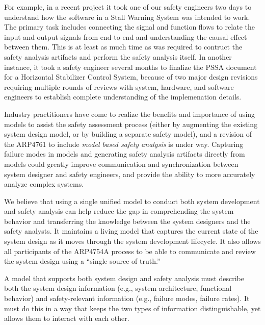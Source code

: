For example, in a recent project it took one of our safety engineers two days to understand how the software in a Stall Warning System was intended to work. The primary task includes connecting the signal and function flows to relate the input and output signals from end-to-end and understanding the causal effect between them. This is at least as much time as was required to contruct the safety analysis artifacts and perform the safety analysis itself. In another instance, it took a safety engineer several months to finalize the PSSA document for a Horizontal Stabilizer Control System, because of two major design revisions requiring multiple rounds of reviews with system, hardware, and software engineers to establish complete understanding of the implemenation details.

Industry practitioners have come to realize the benefits and importance of
using models to assist the safety assessment process (either by augmenting the existing system design model, or by building a separate safety model), and a revision of the ARP4761 to include {\em model based safety analysis} is under way.
Capturing failure modes in models and generating safety analysis artifacts directly from models could greatly improve communication and synchronization between system designer and safety engineers, and provide the ability to more accurately analyze complex systems. 

We believe that using a single unified model to conduct both system development and safety analysis can help reduce the gap in comprehending the system behavior and transferring the knowledge between the system designers and the safety analysts. It maintains a living model that captures the current state of the system design as it moves through the system development lifecycle.
It also allows all participants of the ARP4754A process to be able to communicate and review the system design using a ``single source of truth.''

A model that supports both system design and safety analysis must describe both the system design information (e.g., system architecture, functional behavior) and safety-relevant information (e.g., failure modes, failure rates).  It must do this in a way that keeps the two types of information distinguishable, yet allows them to interact with each other.

